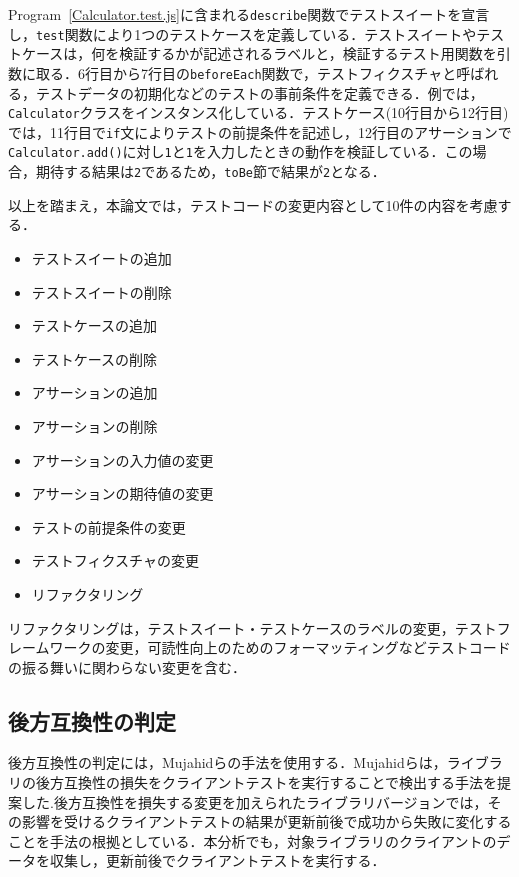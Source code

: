 \documentclass[11pt,dvipdfmx]{jreport}
\begin{document}
Program~\ref{Calculator.test.js}に含まれる{\verb|describe|}関数でテストスイートを宣言し，{\verb|test|}関数により1つのテストケースを定義している．テストスイートやテストケースは，何を検証するかが記述されるラベルと，検証するテスト用関数を引数に取る．6行目から7行目の{\verb|beforeEach|}関数で，テストフィクスチャと呼ばれる，テストデータの初期化などのテストの事前条件を定義できる．例では，{\verb|Calculator|}クラスをインスタンス化している．テストケース(10行目から12行目)では，11行目で{\verb|if|}文によりテストの前提条件を記述し，12行目のアサーションで{\verb|Calculator.add()|}に対し{\verb|1|}と{\verb|1|}を入力したときの動作を検証している．この場合，期待する結果は{\verb|2|}であるため，{\verb|toBe|}節で結果が{\verb|2|}となる．

以上を踏まえ，本論文では，テストコードの変更内容として10件の内容を考慮する．

\begin{itemize}
  \setlength{\itemsep}{0cm}
  \item テストスイートの追加
  \item テストスイートの削除
  \item テストケースの追加
  \item テストケースの削除
  \item アサーションの追加
  \item アサーションの削除
  \item アサーションの入力値の変更
  \item アサーションの期待値の変更
  \item テストの前提条件の変更
  \item テストフィクスチャの変更
  \item リファクタリング
\end{itemize}

リファクタリングは，テストスイート・テストケースのラベルの変更，テストフレームワークの変更，可読性向上のためのフォーマッティングなどテストコードの振る舞いに関わらない変更を含む．

\subsection{後方互換性の判定}\label{kouhougokanseinohantei}
後方互換性の判定には，Mujahidらの手法を使用する．Mujahidらは，ライブラリの後方互換性の損失をクライアントテストを実行することで検出する手法を提案した\cite{mujahid}.後方互換性を損失する変更を加えられたライブラリバージョンでは，その影響を受けるクライアントテストの結果が更新前後で成功から失敗に変化することを手法の根拠としている．本分析でも，対象ライブラリのクライアントのデータを収集し，更新前後でクライアントテストを実行する．
\end{document}
